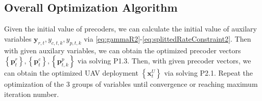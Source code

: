 \documentclass[twocolumn,journal]{IEEEtran}
\begin{document}
\subsection{Overall Optimization Algorithm}
Given the initial value of precoders, we can calculate the initial value of auxilary variables \(\boldsymbol{y}_{r,t},y_{c,t,k},y_{p,t,k}\) via \eqref{eq:gammaR2}-\eqref{eq:splittedRateConstraint2}. Then with given auxilary variables, we can obtain the optimized precoder vectors \(\left\{\boldsymbol{p}^{r}_{t}\right\},\left\{\boldsymbol{p}^{c}_{t}\right\},  \left\{\boldsymbol{p}^{p}_{t,k}\right\}\) via solving P1.3. Then, with given precoder vectors, we can obtain the optimized UAV deployment \(\left\{\boldsymbol{x}^{U}_{t}\right\}\) via solving P2.1. Repeat the optimization of the 3 groups of variables until convergence or reaching maximum iteration number. 
\end{document}
